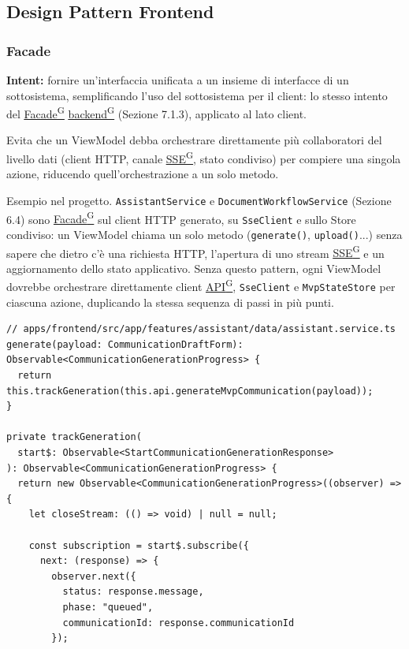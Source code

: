 \documentclass[a4paper,12pt]{article}
\providecommand{\glslink}[2]{\href{https://alittlebyte-19.github.io/Documentazione/glossario.html\#gls-#1}{\underline{#2}\textsuperscript{\scriptsize G}}}
\begin{document}
\begin{sloppypar}
\subsection{Design Pattern Frontend}

\subsubsection{Facade}

\textbf{Intent:} fornire un'interfaccia unificata a un insieme di interfacce di un sottosistema, semplificando l'uso del sottosistema per il client: lo stesso intento del \glslink{facade}{Facade} \glslink{backend}{backend} (Sezione 7.1.3), applicato al lato client.

Evita che un ViewModel debba orchestrare direttamente più collaboratori del livello dati (client HTTP, canale \glslink{sse-server-sent-events}{SSE}, stato condiviso) per compiere una singola azione, riducendo quell'orchestrazione a un solo metodo.

Esempio nel progetto. \texttt{AssistantService} e \texttt{DocumentWorkflowService} (Sezione 6.4) sono \glslink{facade}{Facade} sul client HTTP generato, su \texttt{SseClient} e sullo Store condiviso: un ViewModel chiama un solo metodo (\texttt{generate()}, \texttt{upload()}...) senza sapere che dietro c'è una richiesta HTTP, l'apertura di uno stream \glslink{sse-server-sent-events}{SSE} e un aggiornamento dello stato applicativo. Senza questo pattern, ogni ViewModel dovrebbe orchestrare direttamente client \glslink{api-application-programming-interface}{API}, \texttt{SseClient} e \texttt{MvpStateStore} per ciascuna azione, duplicando la stessa sequenza di passi in più punti.

\begin{lstlisting}[style=tslisting, caption={AssistantService -- Facade su client HTTP generato, SseClient e MvpStateStore dietro generate()}]
// apps/frontend/src/app/features/assistant/data/assistant.service.ts
generate(payload: CommunicationDraftForm): Observable<CommunicationGenerationProgress> {
  return this.trackGeneration(this.api.generateMvpCommunication(payload));
}

private trackGeneration(
  start$: Observable<StartCommunicationGenerationResponse>
): Observable<CommunicationGenerationProgress> {
  return new Observable<CommunicationGenerationProgress>((observer) => {
    let closeStream: (() => void) | null = null;

    const subscription = start$.subscribe({
      next: (response) => {
        observer.next({
          status: response.message,
          phase: "queued",
          communicationId: response.communicationId
        });


\end{lstlisting}
\end{sloppypar}
\end{document}
